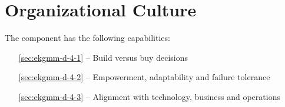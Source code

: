 \chapter{Organizational Culture}\label{ch:ekgmm-d-4}

The  component has the following capabilities:

\begin{itemize}[leftmargin=.5in]
  \item [\ref{sec:ekgmm-d-4-1}]  -- Build versus buy decisions
  \item [\ref{sec:ekgmm-d-4-2}]  -- Empowerment, adaptability and failure tolerance
  \item [\ref{sec:ekgmm-d-4-3}]  -- Alignment with technology, business and operations
\end{itemize}





